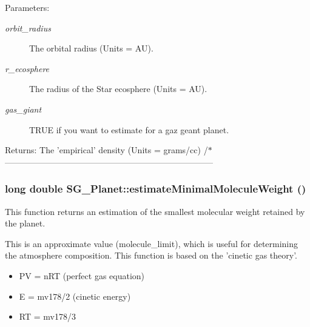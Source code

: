 \begin{Desc}
\item[Parameters:]
\begin{description}
\item[{\em orbit\_\-radius}]The orbital radius (Units = AU). \item[{\em r\_\-ecosphere}]The radius of the Star ecosphere (Units = AU). \item[{\em gas\_\-giant}]TRUE if you want to estimate for a gaz geant planet. \end{description}
\end{Desc}
\begin{Desc}
\item[Returns:]The 'empirical' density (Units = grams/cc) /$\ast$-------------------------------------------------------------------------- \end{Desc}
\subsubsection{\setlength{\rightskip}{0pt plus 5cm}long double SG\_\-Planet::estimate\-Minimal\-Molecule\-Weight ()\hspace{0.3cm}{\tt  [protected]}}\label{class_s_g___planet_b26}


This function returns an estimation of the smallest molecular weight retained by the planet. 

This is an approximate value (molecule\_\-limit), which is useful for determining the atmosphere composition. This function is based on the 'cinetic gas theory'.\begin{itemize}
\item PV = n\-RT (perfect gas equation)\item E = mv178/2 (cinetic energy)\item RT = mv178/3 
\end{itemize}
